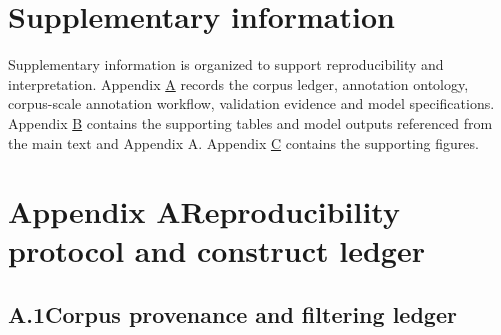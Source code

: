 \clearpage
\section*{Supplementary information}
\label{supp:info}
Supplementary information is organized to support reproducibility and interpretation. Appendix \hyperref[supp:appendix-a]{A} records the corpus ledger, annotation ontology, corpus-scale annotation workflow, validation evidence and model specifications. Appendix \hyperref[supp:appendix-b]{B} contains the supporting tables and model outputs referenced from the main text and Appendix A. Appendix \hyperref[supp:appendix-c]{C} contains the supporting figures.

\makeatletter
\setlength{\@fptop}{0pt}
\setlength{\@fpsep}{8pt plus 2pt}
\setlength{\@fpbot}{0pt plus 1fil}
\makeatother


\providecommand{\appcomment}[1]{\par\noindent\textcolor{orange!85!black}{\textbf{Comment addressed:} #1}\par}
\providecommand{\apporig}[1]{\par\noindent\textcolor{red}{\textbf{Original:} #1}\par}
\providecommand{\apprev}[1]{\par\noindent\textbf{Revised:} #1\par}

\section*{Appendix A\quad Reproducibility protocol and construct ledger}
\label{supp:appendix-a}
\setcounter{table}{0}
\renewcommand{\thetable}{A\arabic{table}}

\subsection*{A.1\quad Corpus provenance and filtering ledger}
\label{supp:a1}




\clearpage
  

